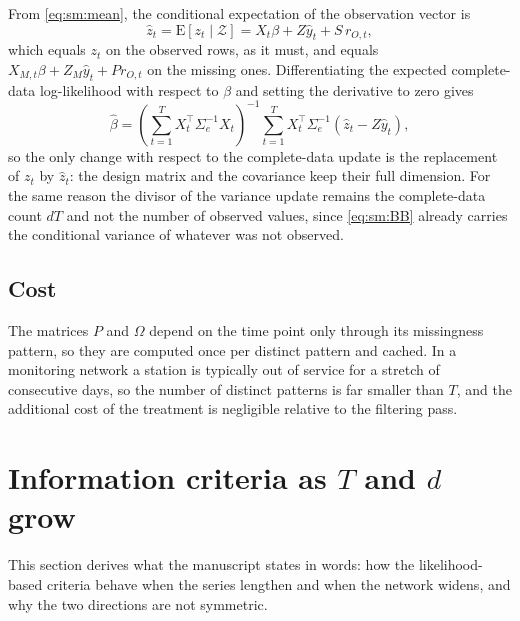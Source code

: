 \documentclass[11pt]{article}
\begin{document}
From \eqref{eq:sm:mean}, the conditional expectation of the observation vector is
\begin{equation}\label{eq:sm:zhat}
  \hat{z}_t = \mathrm{E}\!\left[z_t \mid \mathcal{Z}\right]
            = X_t\beta + Z\hat{y}_t + S\, r_{O,t},
\end{equation}
which equals $z_t$ on the observed rows, as it must, and equals $X_{M,t}\beta + Z_M \hat{y}_t + P r_{O,t}$ on the missing ones. Differentiating the expected complete-data log-likelihood with respect to $\beta$ and setting the derivative to zero gives
\begin{equation}\label{eq:sm:beta}
  \hat{\beta} = \left(\sum_{t=1}^{T} X_t^\top \Sigma_e^{-1} X_t\right)^{-1}
                \sum_{t=1}^{T} X_t^\top \Sigma_e^{-1}\left(\hat{z}_t - Z \hat{y}_t\right),
\end{equation}
so the only change with respect to the complete-data update is the replacement of $z_t$ by $\hat{z}_t$: the design matrix and the covariance keep their full dimension. For the same reason the divisor of the variance update remains the complete-data count $dT$ and not the number of observed values, since \eqref{eq:sm:BB} already carries the conditional variance of whatever was not observed.

\subsection{Cost}

The matrices $P$ and $\Omega$ depend on the time point only through its missingness pattern, so they are computed once per distinct pattern and cached. In a monitoring network a station is typically out of service for a stretch of consecutive days, so the number of distinct patterns is far smaller than $T$, and the additional cost of the treatment is negligible relative to the filtering pass.

\section{Information criteria as \texorpdfstring{$T$}{T} and \texorpdfstring{$d$}{d} grow}\label{sm:ic}

This section derives what the manuscript states in words: how the likelihood-based criteria behave when the series lengthen and when the network widens, and why the two directions are not symmetric.
\end{document}
